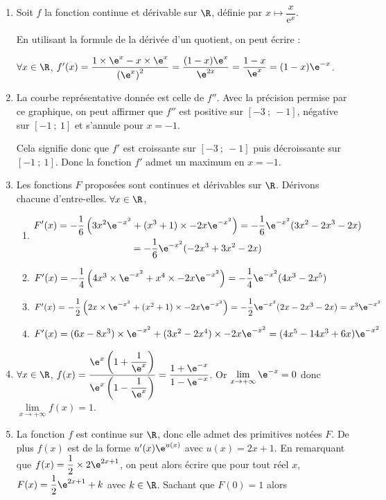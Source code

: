 \medskip

\begin{enumerate}
	\item Soit $f$ la fonction continue et dérivable sur $\R$, définie par $x \longmapsto \dfrac{x}{\text{e}^x}$.
	
	En utilisant la formule de la dérivée d'un quotient, on peut écrire :
	
	$\forall x \in \R$, $f'(x)=\dfrac{1\times \e^{x}-x\times \e^x}{\left(\e^x\right)^2}=\dfrac{(1-x)\e^x}{\e^{2x}}=\dfrac{1-x}{\e^x}=(1-x)\e^{-x}$. \hfill {}
	\item La courbe représentative donnée est celle de $f''$. Avec la précision permise par ce graphique, on peut affirmer que $f''$ est positive sur $[-3~;~-1]$, négative sur $[-1~;~1]$ et s'annule pour $x= - 1$. 
	
Cela signifie donc que $f'$ est croissante sur $[-3~;~-1]$ puis décroissante sur $[-1~;~1]$. Donc la fonction $f'$ admet un maximum en $x = -1$. \hfill {}
	\item Les fonctions $F$ proposées sont continues et dérivables sur $\R$. Dérivons chacune d'entre-elles. $\forall x \in \R$, 
	\begin{enumerate}
		\item $\begin{gathered}F'(x)=-\dfrac{1}{6}\left(3x^2\e^{-x^2}+(x^3+1)\times -2x\e^{-x^2}\right)=-\dfrac{1}{6}\e^{-x^2}(3x^2-2x^3-2x)\\=-\dfrac{1}{6}\e^{-x^2}(-2x^3+3x^2-2x)\end{gathered}$
		\item $F'(x)=-\dfrac{1}{4}\left(4x^3 \times \e^{-x^2}+x^4\times -2x\e^{-x^2}\right)=-\dfrac{1}{4}\e^{-x^2}(4x^3-2x^5)$
		\item $F'(x)=-\dfrac{1}{2}\left(2x\times \e^{-x^2}+(x^2+1)\times -2x\e^{-x^2}\right)=-\dfrac{1}{2}\e^{-x^2}(2x-2x^3-2x)=x^3\e^{-x^2}$
		\item $F'(x)=(6x-8x^3)\times \e^{-x^2}+(3x^2-2x^4)\times -2x\e^{-x^2}= (4x^5-14x^3+6x)\e^{-x^2} $
	\end{enumerate}
\hfill {}
	\item $\forall x \in \R$, $f(x)=\dfrac{\e^x\left(1+\dfrac{1}{\e^x}\right)}{\e^x\left(1-\dfrac{1}{\e^x}\right)}=\dfrac{1+\e^{-x}}{1-\e^{-x}}$. Or $\displaystyle\lim\limits_{x \rightarrow +\infty} \e^{-x}=0$ donc $\displaystyle\lim\limits_{x \rightarrow +\infty} f(x)=1$. \hfill {}
	\item La fonction $f$ est continue sur $\R$, donc elle admet des primitives notées $F$. De plus $f(x)$ est de la forme $u'(x)\e^{u(x)}$ avec $u(x)=2x+1$. En remarquant que $f(x)=\dfrac{1}{2} \times 2\e^{2x+1}$, on peut alors écrire que pour tout réel $x$, $F(x)=\dfrac{1}{2}\e^{2x+1}+k$ avec $k\in \R$. Sachant que $F(0)=1$ alors
	

\end{enumerate}
